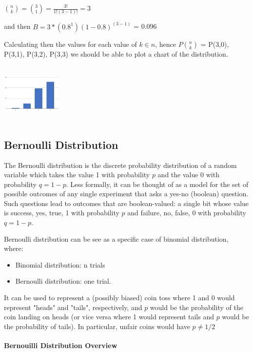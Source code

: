 \documentclass{article}
\begin{document}
$ \displaystyle {\binom {n}{k}} = {\binom {3}{1}} = \frac{3!}{1!(3 - 1)!} = 3$

and then $B = 3 * (0.8^1)(1 - 0.8)^(3-1)$ = 0.096

Calculating then the values for each value of $k \in n$, hence $P\binom {n}{k}$ = P(3,0), P(3,1), P(3,2), P(3,3) we should be able to plot a chart of the distribution.


\includegraphics[width=3cm, height=3cm]{excel_chart_1}

\subsection{Bernoulli Distribution}
The Bernoulli distribution is the discrete probability distribution of a random variable which takes the value 1 with probability $p$ and the value 0 with probability $q = 1 - p$. 
Less formally, it can be thought of as a model for the set of possible outcomes of any single experiment that asks a yes-no (boolean) question. 
Such questions lead to outcomes that are boolean-valued: a single bit whose value is success, yes, true, 1 with probability $p$ and failure, no, false, 0 with probability $q = 1 - p$. 

Bernoulli distribution can be see as a specific case of binomial distribution, where:
\begin{itemize}
    \item Binomial distribution: n trials
    \item Bernoulli distribution: one trial.
\end{itemize}

It can be used to represent a (possibly biased) coin toss where 1 and 0 would represent "heads" and "tails", respectively, and $p$ would be the probability of the coin landing on heads (or vice versa where 1 would represent tails and $p$ would be the probability of tails). In particular, unfair coins would have $p \neq  1/2 $

\paragraph{Bernouilli Distribution Overview}\mbox{} \\
\end{document}
